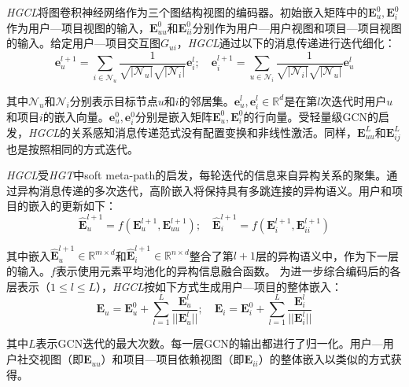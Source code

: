 \documentclass{article}
\begin{document}
\emph{HGCL}将图卷积神经网络作为三个图结构视图的编码器。初始嵌入矩阵中的$\mathbf{E}_u^0,\mathbf{E}_i^0$作为用户—项目视图的输入，$\mathbf{E}_{uu}^0$和$\mathbf{E}_{ii}^0$分别作为用户—用户视图和项目—项目视图的输入。给定用户—项目交互图$G_{ui}$，\emph{HGCL}通过以下的消息传递进行迭代细化：
\begin{equation}
    \mathbf{e}_u^{l+1}=\sum_{i\in\mathcal{N}_u}\frac{1}{\sqrt{|\mathcal{N}_u|}\sqrt{|\mathcal{N}_i|}}\mathbf{e}_i^l; \quad \mathbf{e}_i^{l+1}=\sum_{u\in\mathcal{N}_i}\frac{1}{\sqrt{|\mathcal{N}_i|}\sqrt{|\mathcal{N}_u|}}\mathbf{e}_u^l
\end{equation}

其中$\mathcal{N}_u$和$\mathcal{N}_i$分别表示目标节点$u$和$i$的邻居集。$\mathbf{e}_u^l,\mathbf{e}_i^l\in\mathbb{R}^d$是在第$l$次迭代时用户$u$和项目$i$的嵌入向量。$\mathbf{e}_u^0,\mathbf{e}_i^0$分别是嵌入矩阵$\mathbf{E}_u^0,\mathbf{E}_i^0$的行向量。受轻量级GCN\cite{he2020lightgcnsimplifyingpoweringgraph}的启发，\emph{HGCL}的关系感知消息传递范式没有配置变换和非线性激活。同样，$\mathbf{E}_{uu}^L$和$\mathbf{E}_{ij}^L$也是按照相同的方式迭代。

\emph{HGCL}受\emph{HGT}\cite{hu2020heterogeneousgraphtransformer}中soft meta-path的启发，每轮迭代的信息来自异构关系的聚集。通过异构消息传递的多次迭代，高阶嵌入将保持具有多跳连接的异构语义。用户和项目的嵌入的更新如下：
\begin{equation}
\widehat{\mathbf{E}}_u^{l+1}=f(\mathbf{E}_u^{l+1},\mathbf{E}_{uu}^{l+1}); \quad \widehat{\mathbf{E}}_i^{l+1}=f(\mathbf{E}_i^{l+1},\mathbf{E}_{ii}^{l+1})
\end{equation}

其中嵌入$\widehat{\mathbf{E}}_u^{l+1}\in\mathbb{R}^{m\times d}$和$\widehat{\mathbf{E}}_i^{l+1}\in\mathbb{R}^{n\times d}$整合了第$l+1$层的异构语义中，作为下一层的输入。$f$表示使用元素平均池化的异构信息融合函数。
为进一步综合编码后的各层表示（$1\leq l\leq L$），\emph{HGCL}按如下方式生成用户—项目的整体嵌入：
\begin{equation}
\mathbf{E}_u=\mathbf{E}_u^0 + \sum_{l=1}^L\frac{\mathbf{E}_u^l}{||\mathbf{E}_u^l||}; \quad \mathbf{E}_i=\mathbf{E}_i^0 + \sum_{l=1}^L\frac{\mathbf{E}_i^l}{||\mathbf{E}_i^l||}
\end{equation}

其中$L$表示GCN迭代的最大次数。每一层GCN的输出都进行了归一化。用户—用户社交视图（即$\mathbf{E}_{uu}$）和项目—项目依赖视图（即$\mathbf{E}_{ii}$）的整体嵌入以类似的方式获得。
\end{document}
